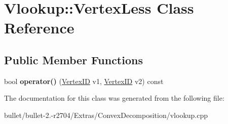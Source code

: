 \hypertarget{class_vlookup_1_1_vertex_less}{\section{Vlookup\+:\+:Vertex\+Less Class Reference}
\label{class_vlookup_1_1_vertex_less}
}
\subsection*{Public Member Functions}
\begin{DoxyCompactItemize}
\item 
\hypertarget{class_vlookup_1_1_vertex_less_aba99286a2ac8c61b8930e11fb9e73581}{bool {\bfseries operator()} (\hyperlink{struct_vlookup_1_1_vertex_i_d}{Vertex\+I\+D} v1, \hyperlink{struct_vlookup_1_1_vertex_i_d}{Vertex\+I\+D} v2) const }\label{class_vlookup_1_1_vertex_less_aba99286a2ac8c61b8930e11fb9e73581}

\end{DoxyCompactItemize}


The documentation for this class was generated from the following file\+:\begin{DoxyCompactItemize}
\item 
bullet/bullet-\/2.-\/r2704/\+Extras/\+Convex\+Decomposition/vlookup.\+cpp\end{DoxyCompactItemize}
